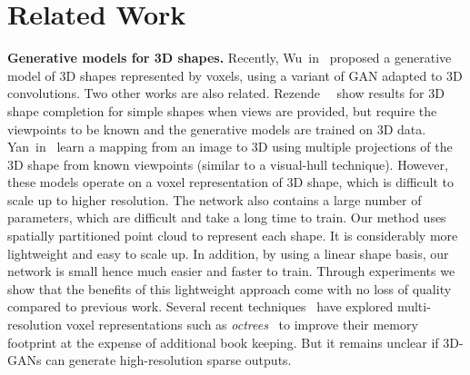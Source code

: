\vspace{-12pt}
\section{Related Work}\label{sec:related}

\noindent \textbf{Generative models for 3D shapes.} Recently, Wu~\etal in~\cite{wu2016learning} proposed a generative model of 3D shapes represented by voxels, using a variant of GAN adapted to 3D convolutions. Two other works are also related. Rezende~\etal~\cite{rezende2016unsupervised} show results for 3D shape completion for simple shapes when views are provided, but require the viewpoints to be known and the generative models are trained on 3D data. Yan~\etal in~\cite{yan2016perspective} learn a mapping from an image to 3D using multiple projections of the 3D shape from known viewpoints (similar to a visual-hull
technique). However, these models operate on a voxel representation of 3D shape, which is difficult to scale up to higher resolution. The network also contains a large number of parameters, which are difficult and take a long time to train. Our method uses spatially partitioned point cloud to represent each shape. It is considerably more lightweight and easy to scale up. In addition, by using a linear shape basis, our network is small hence much easier and faster to train. Through experiments we show that the benefits of this lightweight approach come with no loss of quality compared to previous work. Several recent techniques~\cite{tatarchenko2017octree,Riegler2017CVPR} have explored multi-resolution voxel representations such as \emph{octrees}~\cite{meagher1982geometric} to improve their memory footprint at the expense of additional book keeping. But it remains unclear if 3D-GANs can generate high-resolution sparse outputs.

